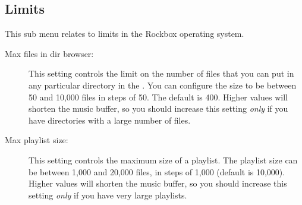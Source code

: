 
\subsection{Limits}
This sub menu relates to limits in the Rockbox operating system.
  \begin{description}
    \item [Max files in dir browser: ]This setting controls the limit on
    the number of files that you can put in any particular directory in the
    . You can configure the size to be between 50 and
    10,000 files in steps of 50. The default is 400. Higher values will shorten
    the music buffer, so you should increase this setting \emph{only} if you have
    directories with a large number of files.

    \item [Max playlist size: ]This setting controls the maximum size of 
    a playlist. The playlist size can be between 1,000 and 20,000 files,
    in steps of 1,000 (default is 10,000). Higher values will shorten the
    music buffer, so you should increase this setting \emph{only} if you
    have very large playlists.
  \end{description}

